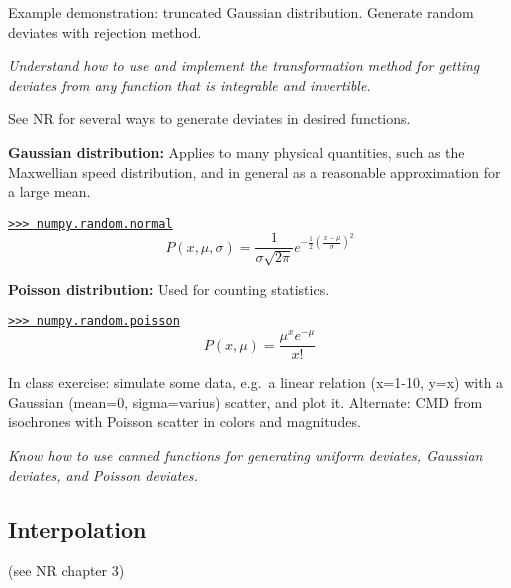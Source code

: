 \documentclass{article}
\newcommand{\test}[1]{%
    \begin{center}
        \colorbox{hl}{\parbox{0.9\textwidth}{\emph{\centering #1}}}
    \end{center}}
\begin{document}
Example demonstration: truncated Gaussian distribution. Generate random
deviates with rejection method.

\test{Understand how to use and implement the transformation method for
getting deviates from any function that is integrable and invertible.}

See NR for several ways to generate deviates in desired functions.

{\bf Gaussian distribution:}
Applies to many physical quantities, such as the Maxwellian speed distribution,
and in general as a reasonable approximation for a large mean.

\href{http://docs.scipy.org/doc/numpy/reference/generated/numpy.random.normal.html}
{\tt >>> numpy.random.normal}
\begin{equation*}
    P(x,\mu,\sigma) = \frac{1}{\sigma\sqrt{2\pi}}
    e^{-\frac{1}{2}(\frac{x-\mu}{\sigma})^2   }
\end{equation*}

{\bf Poisson distribution:}
Used for counting statistics.

\href{http://docs.scipy.org/doc/numpy/reference/generated/numpy.random.poisson.html}
{\tt >>> numpy.random.poisson}
\begin{equation*}
    P(x,\mu) = \frac{\mu^xe^{-\mu}}{x!}
\end{equation*}

In class exercise: simulate some data, e.g.\ a linear relation (x=1-10, y=x)
with a Gaussian (mean=0, sigma=varius) scatter, and plot it.
Alternate: CMD from
isochrones with Poisson scatter in colors and magnitudes.

\test{Know how to use canned functions for generating uniform deviates,
Gaussian deviates, and Poisson deviates.}

\subsection{Interpolation}
(see NR chapter 3)
\end{document}
